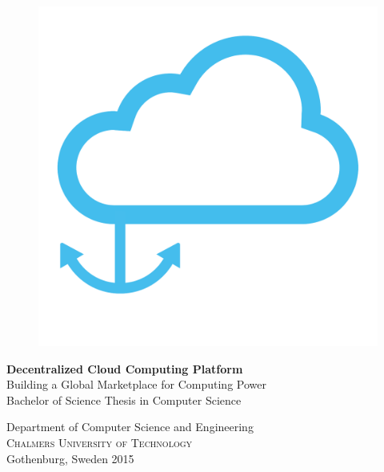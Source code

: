 
\begin{titlepage}
			
\addtolength{\voffset}{2cm}

\begin{figure}[h!]
\centering
\vspace{2cm}	%
\includegraphics[width=0.6\linewidth]{figure/flygapomolnochdocka}
\end{figure}

\mbox{}
\vfill
\renewcommand{\familydefault}{\sfdefault} \normalfont %
\noindent \textbf{\Huge Decentralized Cloud Computing Platform}\\[0.2cm]
{\Large Building a Global Marketplace for Computing Power}\\[0.5cm]
Bachelor of Science Thesis in Computer Science \\[0.5cm]


\noindent Department of Computer Science and Engineering \\
\textsc{Chalmers University of Technology} \\
Gothenburg, Sweden 2015

\renewcommand{\familydefault}{\rmdefault} \normalfont %
\end{titlepage}


